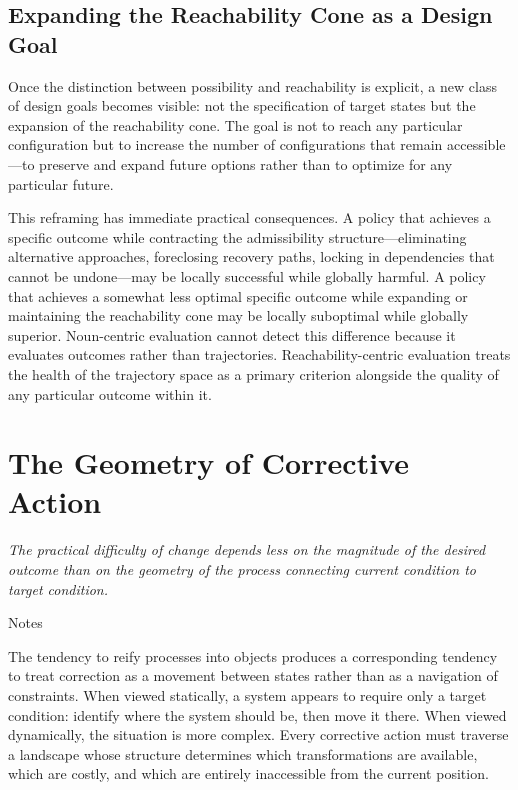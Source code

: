 \documentclass[12pt, a4paper]{article}
\theoremstyle{plain}
\theoremstyle{definition}
\theoremstyle{remark}
\begin{document}
\subsection{Expanding the Reachability Cone as a Design Goal}

Once the distinction between possibility and reachability is explicit, a
new class of design goals becomes visible: not the specification of target
states but the expansion of the reachability cone. The goal is not to reach
any particular configuration but to increase the number of configurations
that remain accessible---to preserve and expand future options rather than
to optimize for any particular future.

This reframing has immediate practical consequences. A policy that achieves
a specific outcome while contracting the admissibility structure---eliminating
alternative approaches, foreclosing recovery paths, locking in dependencies
that cannot be undone---may be locally successful while globally harmful.
A policy that achieves a somewhat less optimal specific outcome while expanding
or maintaining the reachability cone may be locally suboptimal while globally
superior. Noun-centric evaluation cannot detect this difference because it
evaluates outcomes rather than trajectories. Reachability-centric evaluation
treats the health of the trajectory space as a primary criterion alongside
the quality of any particular outcome within it.

\section{The Geometry of Corrective Action}
\label{sec:geometry}

\epigraph{\textit{The practical difficulty of change depends less on the
magnitude of the desired outcome than on the geometry of the process
connecting current condition to target condition.}}{Notes}

\noindent
The tendency to reify processes into objects produces a corresponding tendency
to treat correction as a movement between states rather than as a navigation
of constraints. When viewed statically, a system appears to require only a
target condition: identify where the system should be, then move it there.
When viewed dynamically, the situation is more complex. Every corrective
action must traverse a landscape whose structure determines which
transformations are available, which are costly, and which are entirely
inaccessible from the current position.
\end{document}
